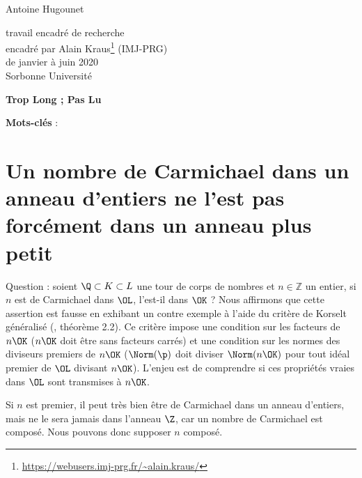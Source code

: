 \documentclass[a4paper, 12pt, oneside]{article}
\begin{document}
\begin{titlepage}
\begin{center}
	\large Antoine Hugounet \\

	\vspace{40px}
	\LARGE {}

	\vspace{40px}
	\large
	travail encadré de recherche \\
	encadré par Alain Kraus\footnote{\url{https://webusers.imj-prg.fr/~alain.kraus/}} (IMJ-PRG) \\
	de janvier à juin 2020 \\

	\vspace{20px}
	Sorbonne Université
\end{center}

\normalsize
\vspace{80px}
\begin{center} \textbf{Trop Long ; Pas Lu} \end{center}
\vspace{-1em}

\vfill
\begin{center}
	\normalsize \textbf{Mots-clés} : \textit{}
\end{center}
\end{titlepage}

\section{Un nombre de Carmichael dans un anneau d'entiers ne l'est pas forcément dans un anneau plus petit }

Question : soient $\Q \subset K \subset L$ une tour de corps de nombres et $n\in \mathbb{Z}$ un entier, si $n$ est de Carmichael dans $\OL$, l'est-il dans $\OK$ ? Nous affirmons que cette assertion est fausse en exhibant un contre exemple à l'aide du critère de Korselt généralisé (\cite{article}, théorème 2.2). Ce critère impose une condition sur les facteurs de $n\OK$ ($n\OK$ doit être sans facteurs carrés) et une condition sur les normes des diviseurs premiers de $n\OK$ ($\Norm(\p)$ doit diviser $\Norm(n\OK)$ pour tout idéal premier de $\OL$ divisant $n\OK$). L'enjeu est de comprendre si ces propriétés vraies dans $\OL$ sont transmises à $n\OK$.

\begin{remarque}Si $n$ est premier, il peut très bien être de Carmichael dans un anneau d'entiers, mais ne le sera jamais dans l'anneau $\Z$, car un nombre de Carmichael est composé. Nous pouvons donc supposer $n$ composé. \end{remarque}
\end{document}

